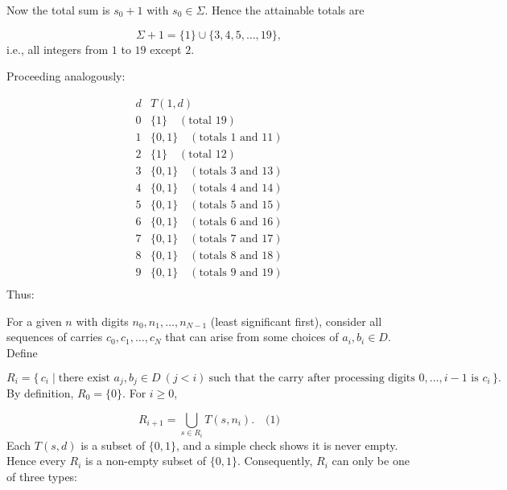 Now the total sum is \(s_0 + 1\) with \(s_0 \in \Sigma\). Hence the attainable totals are\par
\[
\Sigma + 1 = \{1\} \cup \{3,4,5,\dots,19\},
\]
i.e., all integers from \(1\) to \(19\) except \(2\).\par
Proceeding analogously:\par
\[
\begin{array}{c|l}
d & T(1,d) \\ \hline
0 & \{1\} \quad (\text{total }19) \\
1 & \{0,1\} \quad (\text{totals }1\text{ and }11) \\
2 & \{1\} \quad (\text{total }12) \\
3 & \{0,1\} \quad (\text{totals }3\text{ and }13) \\
4 & \{0,1\} \quad (\text{totals }4\text{ and }14) \\
5 & \{0,1\} \quad (\text{totals }5\text{ and }15) \\
6 & \{0,1\} \quad (\text{totals }6\text{ and }16) \\
7 & \{0,1\} \quad (\text{totals }7\text{ and }17) \\
8 & \{0,1\} \quad (\text{totals }8\text{ and }18) \\
9 & \{0,1\} \quad (\text{totals }9\text{ and }19) \\
\end{array}
\]
Thus:\par
{}
For a given \(n\) with digits \(n_0,n_1,\dots,n_{N-1}\) (least significant first), consider all sequences of carries \(c_0,c_1,\dots,c_N\) that can arise from some choices of \(a_i,b_i\in D\). Define\par
\[
R_i = \{\, c_i \mid \text{there exist } a_j,b_j\in D\ (j<i)\ \text{such that the carry after processing digits }0,\dots,i-1\text{ is }c_i\,\}.
\]
By definition, \(R_0 = \{0\}\). For \(i \ge 0\),\par
\[
R_{i+1} = \bigcup_{s \in R_i} T(s, n_i). \quad\text{(1)}
\]
Each \(T(s,d)\) is a subset of \(\{0,1\}\), and a simple check shows it is never empty. Hence every \(R_i\) is a non-empty subset of \(\{0,1\}\). Consequently, \(R_i\) can only be one of three types:\par
{}
